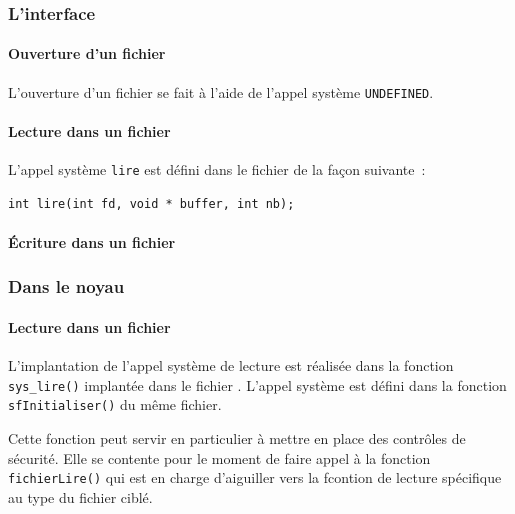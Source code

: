 \subsubsection{L'interface}

%
%
%
\paragraph{Ouverture d'un fichier}

L'ouverture d'un fichier se fait à l'aide de l'appel système
\lstinline!UNDEFINED!.

%
%
%
\paragraph{Lecture dans un fichier}

L'appel système \lstinline!lire! est défini dans le fichier
 de la façon suivante~:

\begin{lstlisting}
int lire(int fd, void * buffer, int nb);
\end{lstlisting}

%
%
%
\paragraph{Écriture dans un fichier}

%
\subsubsection{Dans le noyau}

%
%
%
\paragraph{Lecture dans un fichier}

   L'implantation de l'appel système de lecture est réalisée dans la
fonction \lstinline!sys_lire()! implantée dans le fichier
. L'appel système est défini dans la fonction
\lstinline!sfInitialiser()! du même fichier.

   Cette fonction peut servir en particulier à mettre en place des
contrôles de sécurité. Elle se contente pour le moment de faire appel
à la fonction \lstinline!fichierLire()! qui est en charge d'aiguiller
vers la fcontion de lecture spécifique au type du fichier ciblé.

